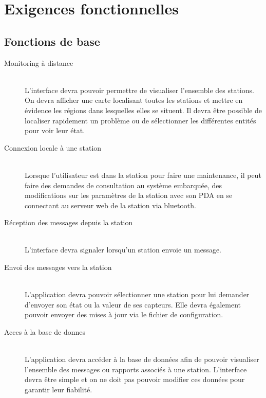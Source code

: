
\section{Exigences fonctionnelles}

\subsection{Fonctions de base}

\begin{description}
	\item[ Monitoring à distance]\hfill\\
		L'interface devra pouvoir permettre de visualiser l'ensemble des stations. On devra afficher une carte localisant toutes les stations et mettre en évidence les régions dans lesquelles elles se situent. Il devra être possible de localiser rapidement un problème ou de sélectionner les différentes entités pour voir leur état.\\
		
	\item[Connexion locale à une station]\hfill\\
	 	Lorsque l'utilisateur est dans la station pour faire une maintenance, il peut faire des demandes de consultation au système embarquée, des modifications sur les paramètres de la station avec son PDA en se connectant au serveur web de la station via bluetooth. 
		
	\item [Réception des messages depuis la station]\hfill\\
		L'interface devra signaler lorsqu'un station envoie un message. \\

	\item [Envoi des messages vers la station]\hfill\\
		L'application devra pouvoir sélectionner une station pour lui demander d'envoyer son état ou la valeur de ses capteurs. Elle devra également pouvoir envoyer des mises à jour via le fichier de configuration.\\

	\item [Acces à la base de donnes]\hfill\\
		L'application devra accéder à la base de données afin de pouvoir visualiser l'ensemble des messages ou rapports associés à une station. L'interface devra être simple et on ne doit pas pouvoir modifier ces données pour garantir leur fiabilité.
\end{description}


